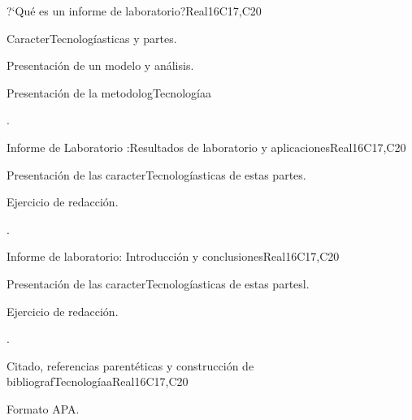 \begin{syllabus}
\begin{unit}{?`Qué es un informe de laboratorio?}{}{Real}{16}{C17,C20}
  \begin{topics}
      \item CaracterTecnologíasticas y partes.
      \item Presentación de un modelo y análisis.
      \item Presentación de la metodologTecnologíaa 
  \end{topics}

  \begin{learningoutcomes}
   \item .%
  \end{learningoutcomes}
\end{unit}

\begin{unit}{Informe de Laboratorio :Resultados de laboratorio y aplicaciones}{}{Real}{16}{C17,C20}
  \begin{topics}
      \item Presentación de las caracterTecnologíasticas de estas partes.
      \item Ejercicio de redacción.
  \end{topics}

  \begin{learningoutcomes}
   \item .%
  \end{learningoutcomes}
\end{unit}

\begin{unit}{Informe de laboratorio: Introducción y conclusiones}{}{Real}{16}{C17,C20}
  \begin{topics}
      \item Presentación de las caracterTecnologíasticas de estas partesl.
      \item Ejercicio de redacción.
  \end{topics}

  \begin{learningoutcomes}
   \item .%
  \end{learningoutcomes}
\end{unit}

\begin{unit}{Citado, referencias parentéticas y construcción de bibliografTecnologíaa}{}{Real}{16}{C17,C20}
  \begin{topics}
      \item Formato APA.
  \end{topics}


\end{unit}
\end{syllabus}

